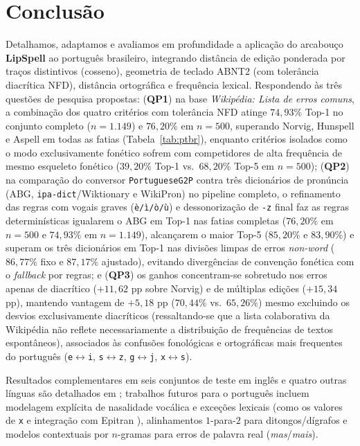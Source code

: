 \documentclass[a4paper, twocolumn, 11pt, twoside]{article}
\begin{document}
\section{Conclusão}
Detalhamos, adaptamos e avaliamos em profundidade a aplicação do arcabouço \textbf{LipSpell} \citep{araujo2026lipspell} ao português brasileiro, integrando distância de edição ponderada por traços distintivos (cosseno), geometria de teclado ABNT2 (com tolerância diacrítica NFD), distância ortográfica e frequência lexical. Respondendo às três questões de pesquisa propostas: (\textbf{QP1}) na base \textit{Wikipédia: Lista de erros comuns}, a combinação dos quatro critérios com tolerância NFD atinge $74{,}93\%$ Top-1 no conjunto completo ($n=1.149$) e $76{,}20\%$ em $n=500$, superando Norvig, Hunspell e Aspell em todas as fatias (Tabela~\ref{tab:ptbr}), enquanto critérios isolados como o modo exclusivamente fonético sofrem com competidores de alta frequência de mesmo esqueleto fonético ($39{,}20\%$ Top-1 vs.\ $68{,}20\%$ Top-5 em $n=500$); (\textbf{QP2}) na comparação do conversor \texttt{PortugueseG2P} contra três dicionários de pronúncia (ABG, \texttt{ipa-dict}/Wiktionary e WikiPron) no pipeline completo, o refinamento das regras com vogais graves (\texttt{è/ì/ò/ù}) e dessonorização de \texttt{-z} final faz as regras determinísticas igualarem o ABG em Top-1 nas fatias completas ($76{,}20\%$ em $n=500$ e $74{,}93\%$ em $n=1.149$), alcançarem o maior Top-5 ($85{,}20\%$ e $83{,}90\%$) e superam os três dicionários em Top-1 nas divisões limpas de erros \textit{non-word} ($86{,}77\%$ fixo e $87{,}17\%$ ajustado), evitando divergências de convenção fonética com o \textit{fallback} por regras; e (\textbf{QP3}) os ganhos concentram-se sobretudo nos erros apenas de diacrítico ($+11{,}62$ pp sobre Norvig) e de múltiplas edições ($+15{,}34$ pp), mantendo vantagem de $+5{,}18$ pp ($70{,}44\%$ vs.\ $65{,}26\%$) mesmo excluindo os desvios exclusivamente diacríticos (ressaltando-se que a lista colaborativa da Wikipédia não reflete necessariamente a distribuição de frequências de textos espontâneos), associados às confusões fonológicas e ortográficas mais frequentes do português (\texttt{e}$\leftrightarrow$\texttt{i}, \texttt{s}$\leftrightarrow$\texttt{z}, \texttt{g}$\leftrightarrow$\texttt{j}, \texttt{x}$\leftrightarrow$\texttt{s}).

Resultados complementares em seis conjuntos de teste em inglês e quatro outras línguas são detalhados em \citet{araujo2026lipspell}; trabalhos futuros para o português incluem modelagem explícita de nasalidade vocálica e exceções lexicais (como os valores de \texttt{x} e integração com Epitran \citep{mortensen2018epitran}), alinhamentos $1$-para-$2$ para ditongos/dígrafos e modelos contextuais por $n$-gramas para erros de palavra real (\textit{mas}/\textit{mais}).
\end{document}
